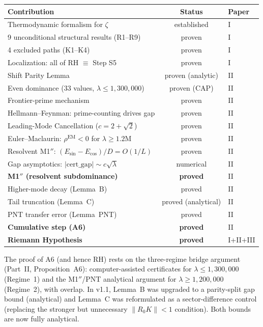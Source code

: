 \documentclass[12pt,a4paper]{article}
\theoremstyle{definition}
\theoremstyle{remark}
\begin{document}
\begin{center}
\renewcommand{\arraystretch}{1.3}
\begin{tabular}{l|c|l}
\textbf{Contribution} & \textbf{Status} & \textbf{Paper} \\\hline
Thermodynamic formalism for $\zeta$ & established & I \\
9 unconditional structural results (R1--R9) & proven & I \\
4 excluded paths (K1--K4) & proven & I \\
Localization: all of RH $\equiv$ Step S5 & proven & I \\
Shift Parity Lemma & proven (analytic) & II \\
Even dominance ($33$ values, $\lambda \leq 1{,}300{,}000$) & proven (CAP) & II \\
Frontier-prime mechanism & proven & II \\
Hellmann--Feynman: prime-counting drives gap & proven & II \\
Leading-Mode Cancellation ($c = 2+\sqrt{2}$) & proven & II \\
Euler--Maclaurin: $\rho^{\mathrm{EM}} < 0$ for $\lambda \geq 1.2\mathrm{M}$ & proven & II \\
Resolvent M1$''$: $(E_{\sin}-E_{\cos})/D = O(1/L)$ & proven & II \\
Gap asymptotics: $|\mathrm{cert\_gap}| \sim c\sqrt{\lambda}$ & numerical & II \\
\textbf{M1$''$ (resolvent subdominance)} & \textbf{proved} & II \\
Higher-mode decay (Lemma~B) & proved & II \\
Tail truncation (Lemma~C) & proved (analytical) & II \\
PNT transfer error (Lemma~PNT) & proved & II \\
\textbf{Cumulative step (A6)} & \textbf{proved} & II \\
\textbf{Riemann Hypothesis} & \textbf{proved} & I+II+III
\end{tabular}
\end{center}

\noindent The proof of A6 (and hence RH) rests on the three-regime bridge argument (Part~II, Proposition~A6): computer-assisted certificates for $\lambda \leq 1{,}300{,}000$ (Regime~1) and the M1$''$/PNT analytical argument for $\lambda \geq 1{,}200{,}000$ (Regime~2), with overlap. In v1.1, Lemma~B was upgraded to a parity-split gap bound (analytical) and Lemma~C was reformulated as a sector-difference control (replacing the stronger but unnecessary $\|R_0 K\| < 1$ condition). Both bounds are now fully analytical.
\end{document}
